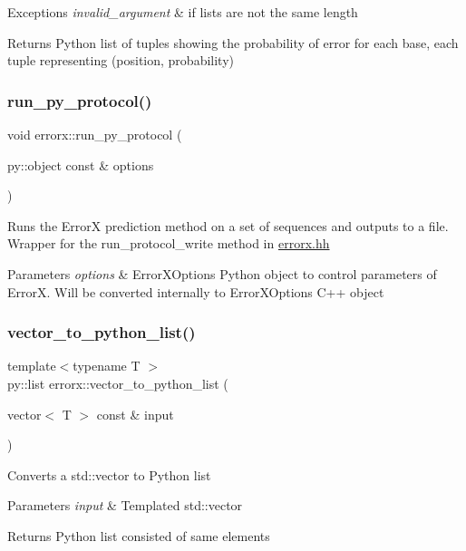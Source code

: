 \begin{DoxyExceptions}{Exceptions}
{\em invalid\+\_\+argument} & if lists are not the same length\\
\hline
\end{DoxyExceptions}
\begin{DoxyReturn}{Returns}
Python list of tuples showing the probability of error for each base, each tuple representing (position, probability) 
\end{DoxyReturn}
\mbox{\label{errorx__python_8hh_file_ac6fa2bc931a560730bd2983e34e0de43}} 
\subsubsection{\texorpdfstring{run\+\_\+py\+\_\+protocol()}{run\_py\_protocol()}}
{\footnotesize\ttfamily void errorx\+::run\+\_\+py\+\_\+protocol (\begin{DoxyParamCaption}\item[{py\+::object const \&}]{options }\end{DoxyParamCaption})}

Runs the ErrorX prediction method on a set of sequences and outputs to a file. Wrapper for the run\+\_\+protocol\+\_\+write method in \mbox{\hyperlink{errorx_8hh}{errorx.\+hh}}


\begin{DoxyParams}{Parameters}
{\em options} & Error\+X\+Options Python object to control parameters of ErrorX. Will be converted internally to Error\+X\+Options C++ object \\
\hline
\end{DoxyParams}
\mbox{\label{errorx__python_8hh_file_a78a6da555a72f6000521dc688b9b96fd}} 
\subsubsection{\texorpdfstring{vector\+\_\+to\+\_\+python\+\_\+list()}{vector\_to\_python\_list()}}
{\footnotesize\ttfamily template$<$typename T $>$ \\
py\+::list errorx\+::vector\+\_\+to\+\_\+python\+\_\+list (\begin{DoxyParamCaption}\item[{vector$<$ T $>$ const \&}]{input }\end{DoxyParamCaption})}

Converts a std\+::vector to Python list


\begin{DoxyParams}{Parameters}
{\em input} & Templated std\+::vector \\
\hline
\end{DoxyParams}
\begin{DoxyReturn}{Returns}
Python list consisted of same elements 
\end{DoxyReturn}
